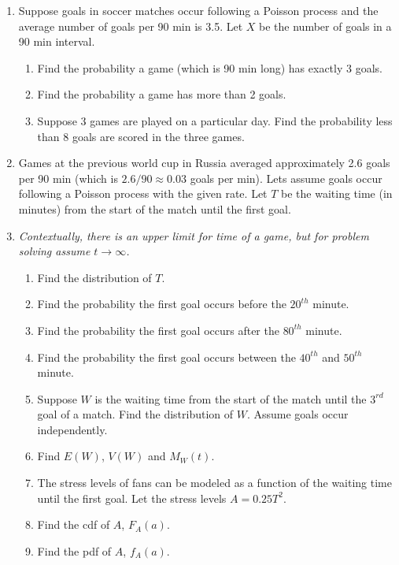 \documentclass{article}
\begin{document}
\begin{enumerate}
    \item Suppose goals in soccer matches occur following a Poisson process and the average number of goals per 90 min is 3.5. Let $X$ be the number of goals in a 90 min interval.\bigskip
    \begin{enumerate}
        \item Find the probability a game (which is 90 min long) has exactly 3 goals.\vspace{60pt}
        \item Find the probability a game has more than 2 goals.\vspace{60pt}
        \item Suppose 3 games are played on a particular day. Find the probability less than 8 goals are scored in the three games.\vspace{80pt}
    \end{enumerate}\bigskip

     \item Games at the previous world cup in Russia averaged approximately 2.6 goals per 90 min (which is $2.6 / 90 \approx 0.03$ goals per min). Lets assume goals occur following a Poisson process with the given rate. Let $T$ be the waiting time (in minutes) from the start of the match until the first goal.
     \item[] \textit{Contextually, there is an upper limit for time of a game, but for problem solving assume $t \rightarrow \infty$.}\bigskip
     \begin{enumerate}
         \item Find the distribution of $T$.\vspace{30pt}
         \item Find the probability the first goal occurs before the $20^{th}$ minute.\vspace{50pt}
         \item Find the probability the first goal occurs after the $80^{th}$ minute.\vspace{50pt}
         \item Find the probability the first goal occurs between the $40^{th}$ and $50^{th}$ minute.\vspace{50pt}    
         \item Suppose $W$ is the waiting time from the start of the match until the $3^{rd}$ goal of a match. Find the distribution of $W$. Assume goals occur independently.\vspace{50pt}
         \item Find $E(W)$, $V(W)$ and $M_W(t)$.\vspace{50pt}
         \item The stress levels of fans can be modeled as a function of the waiting time until the first goal. Let the stress levels $A = 0.25T^2$.
         \item[] Find the cdf of $A$, $F_A(a)$.\vspace{150pt}
         \item Find the pdf of $A$, $f_A(a)$.\vspace{150pt}
     \end{enumerate}\bigskip
     

\end{enumerate}
\end{document}
